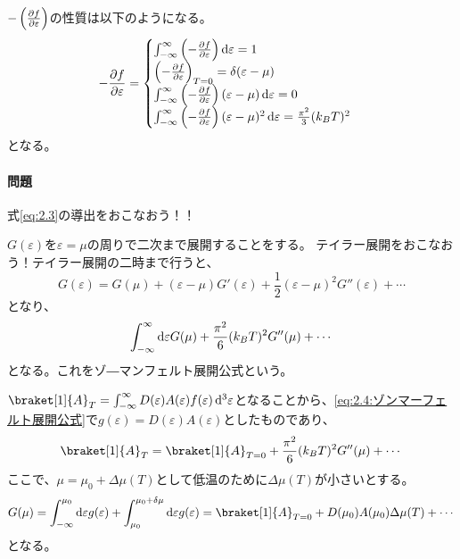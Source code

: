 \documentclass[titlepage]{ltjsarticle}
\newcommand{\ev}[1]{\braket[1]{#1}}
\begin{document}
\(-\left( \pdv{f}{\varepsilon} \right)\)の性質は以下のようになる。
\begin{equation}\label{eq:2.3}
  -\pdv{f}{\varepsilon} = 
  \begin{cases}
    \int_{-\infty}^{\infty}\left( -\pdv{f }{\varepsilon} \right)\odif{\varepsilon} = 1 \\
    \left( -\pdv{f}{\varepsilon} \right)_{T=0} = \delta(\varepsilon-\mu)\\
    \int_{-\infty}^{\infty}\left( - \pdv{f}{\varepsilon} \right)(\varepsilon-\mu) \odif{\varepsilon} = 0\\
    \int_{-\infty}^{\infty}\left( -\pdv{f}{\varepsilon} \right)(\varepsilon-\mu)^2 \odif{\varepsilon} = \frac{\pi^2}{3}(k_BT)^2
  \end{cases}
\end{equation}
となる。

\paragraph{問題}
式\eqref{eq:2.3}の導出をおこなおう！！


\(G(\varepsilon)\)を\(\varepsilon=\mu\)の周りで二次まで展開することをする。
テイラー展開をおこなおう！テイラー展開の二時まで行うと、
\begin{equation}
  G(\varepsilon) = G(\mu) + (\varepsilon-\mu) G'(\varepsilon) + \frac{1}{2}(\varepsilon-\mu)^2G''(\varepsilon) + \cdots 
\end{equation}
となり、
\begin{equation}\label{eq:2.4:ゾンマーフェルト展開公式}
  \int_{-\infty}^{\infty} \odif{\varepsilon} G(\mu) + \frac{\pi^2}{6}(k_BT)^2 G''(\mu) + \cdots 
\end{equation}
となる。これをゾ―マンフェルト展開公式という。

\(  \ev{A}_T = \int_{-\infty}^{\infty} D(\varepsilon)A(\varepsilon)f(\varepsilon) \odif[order=3]{\varepsilon}\)となることから、\eqref{eq:2.4:ゾンマーフェルト展開公式}で\(g(\varepsilon)=D(\varepsilon)A(\varepsilon)\)としたものであり、
\begin{equation}\label{eq:2.5}
  \ev{A}_T = \ev{A}_{T=0} + \frac{\pi^2}{6}(k_BT)^2 G''(\mu)+ \cdots
\end{equation}
ここで、\(\mu=\mu_0+\Delta \mu(T)\)として低温のために\(\varDelta \mu (T)\)が小さいとする。
\begin{equation}
  G(\mu) = \int_{-\infty}^{\mu_0} \odif{\varepsilon} g(\varepsilon) + \int_{\mu_0}^{\mu_0+\delta \mu}\odif{\varepsilon}g(\varepsilon) = \ev{A}_{T=0} + D(\mu_0)A(\mu_0)\Delta \mu(T) + \cdots
\end{equation}
となる。
\end{document}
